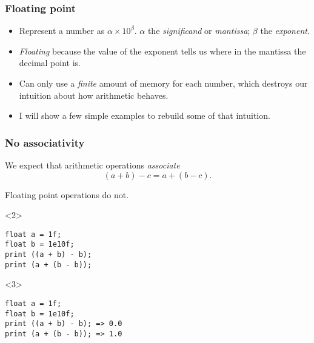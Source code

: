 \documentclass[presentation]{beamer}
\begin{document}
\begin{frame}
  \frametitle{Floating point}
  \begin{itemize}
  \item Represent a number as $\alpha \times 10^\beta$.  $\alpha$ the
    \emph{significand} or \emph{mantissa}; $\beta$ the
    \emph{exponent}.
  \item \emph{Floating} because the value of the exponent tells us
    where in the mantissa the decimal point is.
  \item Can only use a \emph{finite} amount of memory for each number,
    which destroys our intuition about how arithmetic behaves.
  \item I will show a few simple examples to rebuild some of that intuition.
  \end{itemize}
\end{frame}
\begin{frame}[fragile]
  \frametitle{No associativity}
  We expect that arithmetic operations \emph{associate}
  \begin{equation*}
    (a + b) - c = a + (b - c).
  \end{equation*}

  Floating point operations do not.

  \begin{center}
    \begin{onlyenv}<2>
\begin{verbatim}
float a = 1f;
float b = 1e10f;
print ((a + b) - b);
print (a + (b - b));
\end{verbatim}
    \end{onlyenv}
  \end{center}
  \begin{center}
    \begin{onlyenv}<3>
\begin{verbatim}
float a = 1f;
float b = 1e10f;
print ((a + b) - b); => 0.0
print (a + (b - b)); => 1.0
\end{verbatim}
    \end{onlyenv}
  \end{center}
\end{frame}
\end{document}
